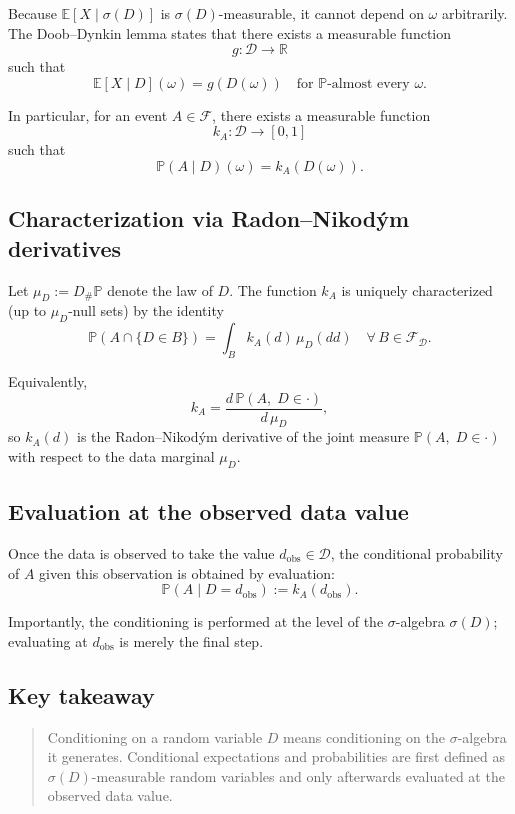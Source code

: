 \documentclass[11pt]{article}
\theoremstyle{remark}
\begin{document}
Because $\mathbb E[X\mid\sigma(D)]$ is $\sigma(D)$-measurable, it cannot depend on
$\omega$ arbitrarily. The Doob--Dynkin lemma states that there exists a measurable
function
\[
g:\mathcal D\to\mathbb R
\]
such that
\[
\mathbb E[X\mid D](\omega)
=
g(D(\omega))
\quad\text{for }\mathbb P\text{-almost every }\omega.
\]

In particular, for an event $A\in\mathcal F$, there exists a measurable function
\[
k_A:\mathcal D\to[0,1]
\]
such that
\[
\mathbb P(A\mid D)(\omega)
=
k_A(D(\omega)).
\]

\subsection{Characterization via Radon--Nikod\'ym derivatives}

Let $\mu_D:=D_{\#}\mathbb P$ denote the law of $D$. The function $k_A$ is uniquely
characterized (up to $\mu_D$-null sets) by the identity
\[
\mathbb P(A\cap\{D\in B\})
=
\int_B k_A(d)\,\mu_D(dd)
\quad\forall\,B\in\mathcal F_{\mathcal D}.
\]

Equivalently,
\[
k_A
=
\frac{d\,\mathbb P(A,\;D\in\cdot)}{d\,\mu_D},
\]
so $k_A(d)$ is the Radon--Nikod\'ym derivative of the joint measure
$\mathbb P(A,\;D\in\cdot)$ with respect to the data marginal $\mu_D$.

\subsection{Evaluation at the observed data value}

Once the data is observed to take the value $d_{\mathrm{obs}}\in\mathcal D$, the
conditional probability of $A$ given this observation is obtained by evaluation:
\[
\mathbb P(A\mid D=d_{\mathrm{obs}})
:=
k_A(d_{\mathrm{obs}}).
\]

Importantly, the conditioning is performed at the level of the $\sigma$-algebra
$\sigma(D)$; evaluating at $d_{\mathrm{obs}}$ is merely the final step.

\subsection{Key takeaway}

\begin{quote}
Conditioning on a random variable $D$ means conditioning on the $\sigma$-algebra it
generates. Conditional expectations and probabilities are first defined as
$\sigma(D)$-measurable random variables and only afterwards evaluated at the observed
data value.
\end{quote}
\end{document}
